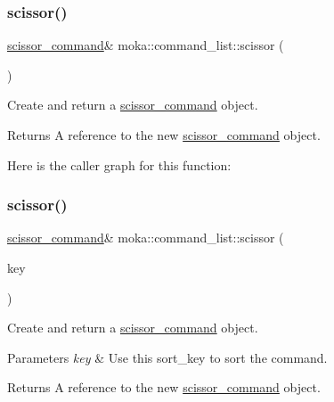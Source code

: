 \mbox{\label{classmoka_1_1command__list_a4e11fd1ef7dfb253e66e62ef88009059}} 
\subsubsection{\texorpdfstring{scissor()}{scissor()}\hspace{0.1cm}{\footnotesize\ttfamily [1/2]}}
{\footnotesize\ttfamily \mbox{\hyperlink{classmoka_1_1scissor__command}{scissor\+\_\+command}}\& moka\+::command\+\_\+list\+::scissor (\begin{DoxyParamCaption}{ }\end{DoxyParamCaption})}



Create and return a \mbox{\hyperlink{classmoka_1_1scissor__command}{scissor\+\_\+command}} object. 

\begin{DoxyReturn}{Returns}
A reference to the new \mbox{\hyperlink{classmoka_1_1scissor__command}{scissor\+\_\+command}} object. 
\end{DoxyReturn}
Here is the caller graph for this function\+:
\mbox{\label{classmoka_1_1command__list_a3c8dfb8a30395d9256fc1b84b471aba3}} 
\subsubsection{\texorpdfstring{scissor()}{scissor()}\hspace{0.1cm}{\footnotesize\ttfamily [2/2]}}
{\footnotesize\ttfamily \mbox{\hyperlink{classmoka_1_1scissor__command}{scissor\+\_\+command}}\& moka\+::command\+\_\+list\+::scissor (\begin{DoxyParamCaption}\item[{\mbox{\hyperlink{namespacemoka_afa30a616e67b83113ebdb857555cf2bb}{sort\+\_\+key}}}]{key }\end{DoxyParamCaption})}



Create and return a \mbox{\hyperlink{classmoka_1_1scissor__command}{scissor\+\_\+command}} object. 


\begin{DoxyParams}{Parameters}
{\em key} & Use this sort\+\_\+key to sort the command. \\
\hline
\end{DoxyParams}
\begin{DoxyReturn}{Returns}
A reference to the new \mbox{\hyperlink{classmoka_1_1scissor__command}{scissor\+\_\+command}} object. 
\end{DoxyReturn}
\mbox{\label{classmoka_1_1command__list_a5383b94dfc9fe4cce43797b09b9b00d3}} 
